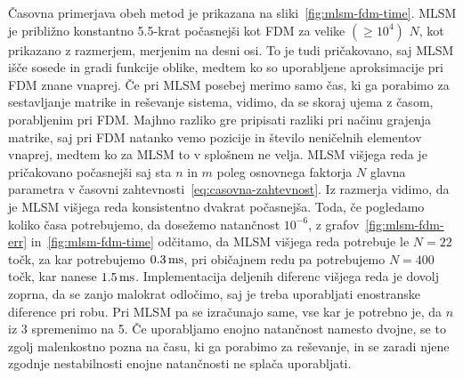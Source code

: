 \documentclass[12pt,a4paper,twoside]{article}
\theoremstyle{definition} %
\theoremstyle{plain} %
\numberwithin{equation}{section}
\begin{document}
Časovna primerjava obeh metod je prikazana na sliki~\ref{fig:mlsm-fdm-time}. MLSM je približno
konstantno 5.5-krat počasnejši kot FDM za velike $(\geq 10^4)$ $N$, kot prikazano z razmerjem,
merjenim na desni osi. To je tudi pričakovano, saj MLSM išče sosede in gradi funkcije oblike, medtem
ko so uporabljene aproksimacije pri FDM znane vnaprej. Če pri MLSM posebej merimo samo čas, ki ga
porabimo za sestavljanje matrike in reševanje sistema, vidimo, da se skoraj ujema z časom,
porabljenim pri FDM. Majhno razliko gre pripisati razliki pri načinu grajenja matrike, saj pri FDM
natanko vemo pozicije in število neničelnih elementov vnaprej, medtem ko za MLSM to v splošnem ne
velja. MLSM višjega reda je pričakovano počasnejši saj sta $n$ in $m$ poleg osnovnega faktorja $N$
glavna parametra v časovni zahtevnosti~\eqref{eq:casovna-zahtevnost}. Iz razmerja vidimo, da je MLSM
višjega reda konsistentno dvakrat počasnejša. Toda, če pogledamo koliko časa potrebujemo, da
dosežemo natančnost $10^{-6}$, z grafov~\ref{fig:mlsm-fdm-err} in~\ref{fig:mlsm-fdm-time} odčitamo,
da MLSM višjega reda potrebuje le $N = 22$ točk, za kar potrebujemo $\unit[0.3]{ms}$, pri običajnem
redu pa potrebujemo $N = 400$ točk, kar nanese $\unit[1.5]{ms}$. Implementacija deljenih diferenc
višjega reda je dovolj zoprna, da se zanjo malokrat odločimo, saj je treba uporabljati enostranske
diference pri robu. Pri MLSM pa se izračunajo same, vse kar je potrebno je, da $n$ iz 3 spremenimo
na 5. Če uporabljamo enojno natančnost namesto dvojne, se to zgolj malenkostno pozna na času, ki ga
porabimo za reševanje, in se zaradi njene zgodnje nestabilnosti enojne natančnosti ne splača uporabljati.
\end{document}
